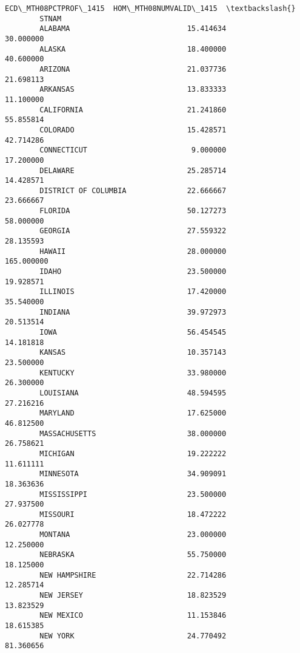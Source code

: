 \documentclass[11pt]{article}
\begin{document}
\begin{Verbatim}[commandchars=\\\{\}]
                              ECD\_MTH08PCTPROF\_1415  HOM\_MTH08NUMVALID\_1415  \textbackslash{}
        STNAM                                                                 
        ALABAMA                           15.414634               30.000000   
        ALASKA                            18.400000               40.600000   
        ARIZONA                           21.037736               21.698113   
        ARKANSAS                          13.833333               11.100000   
        CALIFORNIA                        21.241860               55.855814   
        COLORADO                          15.428571               42.714286   
        CONNECTICUT                        9.000000               17.200000   
        DELAWARE                          25.285714               14.428571   
        DISTRICT OF COLUMBIA              22.666667               23.666667   
        FLORIDA                           50.127273               58.000000   
        GEORGIA                           27.559322               28.135593   
        HAWAII                            28.000000              165.000000   
        IDAHO                             23.500000               19.928571   
        ILLINOIS                          17.420000               35.540000   
        INDIANA                           39.972973               20.513514   
        IOWA                              56.454545               14.181818   
        KANSAS                            10.357143               23.500000   
        KENTUCKY                          33.980000               26.300000   
        LOUISIANA                         48.594595               27.216216   
        MARYLAND                          17.625000               46.812500   
        MASSACHUSETTS                     38.000000               26.758621   
        MICHIGAN                          19.222222               11.611111   
        MINNESOTA                         34.909091               18.363636   
        MISSISSIPPI                       23.500000               27.937500   
        MISSOURI                          18.472222               26.027778   
        MONTANA                           23.000000               12.250000   
        NEBRASKA                          55.750000               18.125000   
        NEW HAMPSHIRE                     22.714286               12.285714   
        NEW JERSEY                        18.823529               13.823529   
        NEW MEXICO                        11.153846               18.615385   
        NEW YORK                          24.770492               81.360656   

\end{Verbatim}
\end{document}
